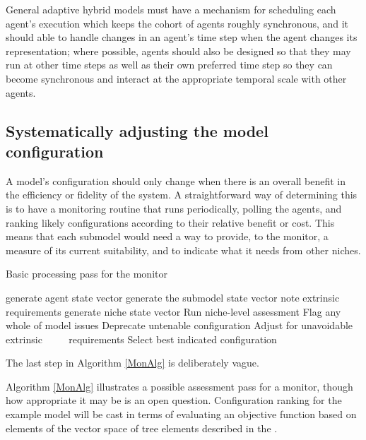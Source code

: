 General adaptive hybrid models must have a mechanism for scheduling
each agent's execution which keeps the cohort of agents roughly
synchronous, and it should able to handle changes in an agent's time
step when the agent changes its rep\-re\-sen\-ta\-tion; where possible, agents
should also be designed so that they may run at other time steps as
well as their own preferred time step so they can become synchronous
and interact at the appropriate temporal scale with other agents.


\subsection{Systematically adjusting the model con\-fig\-ur\-a\-tion}

A model's con\-fig\-ur\-a\-tion should only change when there is an overall
benefit in the efficiency or fidelity of the system.  A
straightforward way of determining this is to have a monitoring
routine that runs periodically, polling the agents, and ranking likely
con\-fig\-ur\-a\-tions according to their relative benefit or cost.  This
means that each sub\-model would need a way to provide, to the monitor,
a measure of its current suitability, and to indicate what it needs
from other niches. 


\begin{algorithm}
  \caption{Basic processing pass for the monitor}
  \label{MonAlg}
  \begin{algorithmic}
    \State generate agent state vector
    \State generate the sub\-model state vector
    \State \qquad note extrinsic requirements
    \EndFor
    \EndFor
    \State
    \State generate niche state vector
    \EndFor
    \State
    \State Run niche-level assessment
    \State Flag any whole of model issues
    \State Deprecate untenable con\-fig\-ur\-a\-tion
    \State Adjust for unavoidable extrinsic
    \State $\qquad$ requirements
    \EndFor
    \State
    \State Select best indicated con\-fig\-ur\-a\-tion
  \end{algorithmic}
\end{algorithm} The last step in Algorithm \ref{MonAlg} is deliberately vague. 

Algorithm \ref{MonAlg} illustrates a possible
assessment pass for a monitor, though how appropriate it may be is an
open question. Configuration ranking for the example model will be
cast in terms of evaluating an objective function based on elements of
the vector space of tree elements described in the \appendixname.


